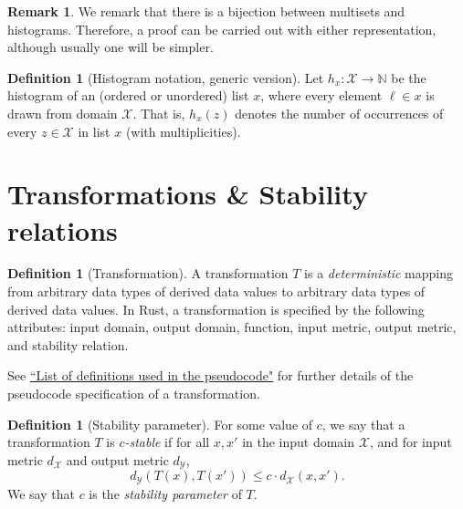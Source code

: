 \documentclass[11pt,a4paper]{article}
\theoremstyle{definition}
\newtheorem{remark}[theorem]{Remark}
\newtheorem{definition}[theorem]{Definition}
\newcommand{\MultiSet}{\mathrm{MultiSet}}
\newcommand{\X}{\mathcal{X}}
\newcommand{\Y}{\mathcal{Y}}
\newcommand{\silvia}[1]{{ {\color{blue}{(silvia)~#1}}}}
\begin{document}
\begin{remark}
    We remark that there is a bijection between multisets and histograms. Therefore, a proof can be carried out with either representation, although usually one will be simpler.
\end{remark}

\begin{definition}[Histogram notation, generic version]
\label{defn:histogram}
    Let $h_x: \mathcal{X} \rightarrow \mathbb{N}$ be the histogram of an (ordered or unordered) list $x$, where every element $\ell\in x$ is drawn from domain $\mathcal{X}$. That is, $h_x(z)$ denotes the number of occurrences of every $z \in \mathcal{X}$ in list $x$ (with multiplicities).
\end{definition}


\section{Transformations \& Stability relations}
\begin{definition}[Transformation]
    A transformation $T$ is a \textit{deterministic} mapping from arbitrary data types of derived data values to arbitrary data types of derived data values. In Rust, a transformation is specified by the following attributes: input domain, output domain, function, input metric, output metric, and stability relation. 
\end{definition}

See \href{https://www.overleaf.com/project/60d215bf90b337ac02200a99}{``List of definitions used in the pseudocode"} for further details of the pseudocode specification of a transformation.

\begin{definition}[Stability parameter]\label{def:c}
    For some value of $c$, we say that a transformation $T$ is $c$\textit{-stable} if for all $x, x'$ in the input domain $\X$, and for input metric $d_{\X}$ and output metric $d_{\Y}$,
    \begin{equation}
        d_{\mathcal{Y}}(T(x), T(x')) \leq c \cdot d_{\mathcal{X}}(x, x').
    \end{equation}
    We say that $c$ is the \textit{stability parameter} of $T$. 
\end{definition}
\end{document}
